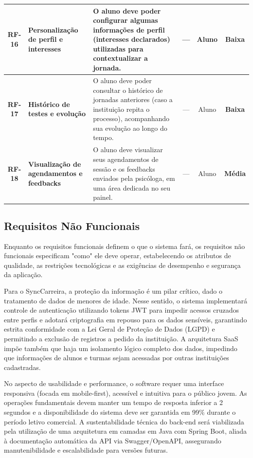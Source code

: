 {\begin{longtable}{|c|p{2.5cm}|p{4.5cm}|c|c|c|}
    \textcolor{blue!70!black}{\textbf{RF-16}} & 
    \textbf{Personalização de perfil e interesses} & 
    O aluno deve poder configurar algumas informações de perfil (interesses declarados) utilizadas para contextualizar a jornada. & 
    --- & 
    Aluno & 
    \textcolor{green!80!black}{\textbf{Baixa}} \\
    \hline

    \textcolor{blue!70!black}{\textbf{RF-17}} & 
    \textbf{Histórico de testes e evolução} & 
    O aluno deve poder consultar o histórico de jornadas anteriores (caso a instituição repita o processo), acompanhando sua evolução ao longo do tempo. & 
    --- & 
    Aluno & 
    \textcolor{green!80!black}{\textbf{Baixa}} \\
    \hline

    \textcolor{blue!70!black}{\textbf{RF-18}} & 
    \textbf{Visualização de agendamentos e feedbacks} & 
    O aluno deve visualizar seus agendamentos de sessão e os feedbacks enviados pela psicóloga, em uma área dedicada no seu painel. & 
    --- & 
    Aluno & 
    \textcolor{orange!80!black}{\textbf{Média}} \\
    \hline
    
\end{longtable}
}

\subsection{Requisitos Não Funcionais}

Enquanto os requisitos funcionais definem o que o sistema fará, os requisitos não funcionais especificam "como" ele deve operar, estabelecendo os atributos de qualidade, as restrições tecnológicas e as exigências de desempenho e segurança da aplicação.

Para o SyncCarreira, a proteção da informação é um pilar crítico, dado o tratamento de dados de menores de idade. Nesse sentido, o sistema implementará controle de autenticação utilizando tokens JWT para impedir acessos cruzados entre perfis e adotará criptografia em repouso para os dados sensíveis, garantindo estrita conformidade com a Lei Geral de Proteção de Dados (LGPD) e permitindo a exclusão de registros a pedido da instituição. A arquitetura SaaS impõe também que haja um isolamento lógico completo dos dados, impedindo que informações de alunos e turmas sejam acessadas por outras instituições cadastradas.

No aspecto de usabilidade e performance, o software requer uma interface responsiva (focada em mobile-first), acessível e intuitiva para o público jovem. As operações fundamentais devem manter um tempo de resposta inferior a 2 segundos e a disponibilidade do sistema deve ser garantida em 99\% durante o período letivo comercial. A sustentabilidade técnica do back-end será viabilizada pela utilização de uma arquitetura em camadas em Java com Spring Boot, aliada à documentação automática da API via Swagger/OpenAPI, assegurando manutenibilidade e escalabilidade para versões futuras.

